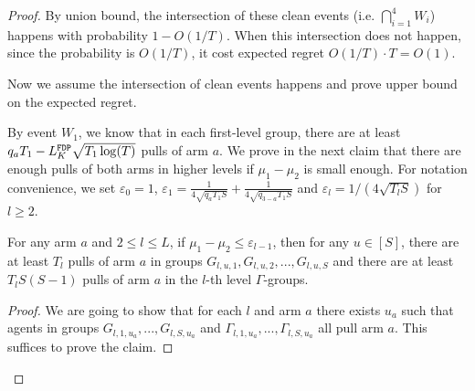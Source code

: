 \begin{proof}
By union bound, the intersection of these clean events (i.e. $\bigcap_{i=1}^4 W_i$) happens with probability $1-O(1/T)$. When this intersection does not happen, since the probability is $O(1/T)$, it cost expected regret $O(1/T) \cdot T = O(1)$. 

Now we assume the intersection of clean events happens and prove upper bound on the expected regret.

By event $W_1$, we know that in each first-level group, there are at least $q_a T_1- L^\mathtt{FDP}_K \sqrt{T_1\log(T)}$ pulls of arm $a$. We prove in the next claim that there are enough pulls of both arms in higher levels if $\mu_1-\mu_2$ is small enough. For notation convenience, we set $\varepsilon_0 = 1$, $\varepsilon_1 = \frac{1}{4\sqrt{q_aT_1S}} + \frac{1}{4\sqrt{q_{3-a} T_1S}}$ and $\varepsilon_l = 1/(4\sqrt{T_lS})$ for $l \geq 2$. 

\begin{claim}
\label{clm:l2_explore}
For any arm $a$ and $2\leq l \leq L$, if $\mu_1 - \mu_2 \leq \varepsilon_{l-1}$, then for any $u \in [S]$, there are at least $T_l$ pulls of arm $a$ in groups $G_{l,u,1},G_{l,u,2}, ... ,G_{l,u,S}$ and there are at least $T_lS(S-1)$ pulls of arm $a$ in the $l$-th level $\Gamma$-groups.
\end{claim}

\begin{proof}
We are going to show that for each $l$ and arm $a$ there exists $u_a$ such that agents in groups $G_{l,1,u_a},...,G_{l,S,u_a}$ and $\Gamma_{l,1,u_a},...,\Gamma_{l,S,u_a}$ all pull arm $a$. This suffices to prove the claim.


\end{proof}
\end{proof}
